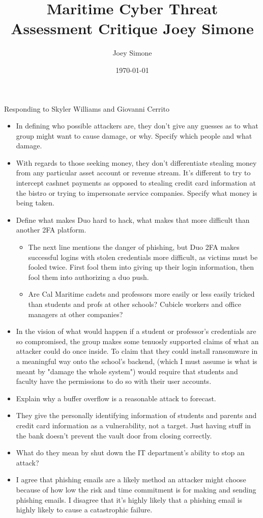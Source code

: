 \documentclass{article}[letterpaper,12pt]
\title{Maritime Cyber Threat Assessment Critique Joey Simone}
\author{Joey Simone}
\date{\today}
\begin{document}
\maketitle
Responding to Skyler Williams and Giovanni Cerrito
\begin{itemize}
    \item In defining who possible attackers are, they don't give any guesses as to what group might want to cause damage, or why. Specify which people and what damage.
    \item With regards to those seeking money, they don't differentiate stealing money from any particular asset account or revenue stream. It's different to try to intercept cashnet payments as opposed to stealing credit card information at the bistro or trying to impersonate service companies. Specify what money is being taken.
    \item Define what makes Duo hard to hack, what makes that more difficult than another 2FA platform. \begin{itemize}
        \item The next line mentions the danger of phishing, but Duo 2FA makes successful logins with stolen credentials more difficult, as victims must be fooled twice. First fool them into giving up their login information, then fool them into authorizing a duo push.
        \item Are Cal Maritime cadets and professors more easily or less easily tricked than students and profs at other schools? Cubicle workers and office managers at other companies?
    \end{itemize}
    \item In the vision of what would happen if a student or professor's credentials are so compromised, the group makes some tenuosly supported claims of what an attacker could do once inside. To claim that they could install ransomware in a meaningful way onto the school's backend, (which I must assume is what is meant by "damage the whole system") would require that students and faculty have the permissions to do so with their user accounts.
    \item Explain why a buffer overflow is a reasonable attack to forecast.
    \item They give the personally identifying information of students and parents and credit card information as a vulnerability, not a target. Just having stuff in the bank doesn't prevent the vault door from closing correctly.
    \item What do they mean by shut down the IT department's ability to stop an attack?
    \item I agree that phishing emails are a likely method an attacker might choose because of how low the risk and time commitment is for making and sending phishing emails. I disagree that it's highly likely that a phishing email is highly likely to cause a catastrophic failure.
\end{itemize}
\end{document}
